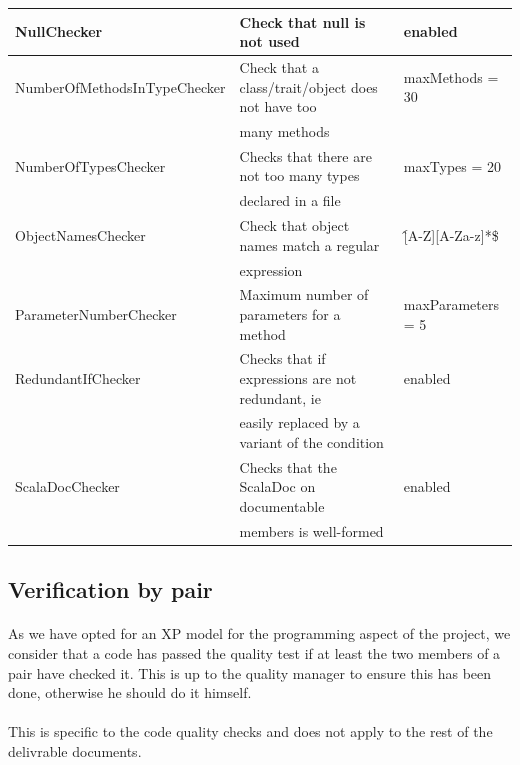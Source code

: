 \documentclass{report}
\begin{document}
\begin{center}
\begin{longtable}{|l|l|l|}
\hline
NullChecker & \small{Check that null is not used} & enabled \\
\hline
\small{NumberOfMethodsInTypeChecker} & \small{Check that a class/trait/object does not have too} & maxMethods = 30 \\
& \small{many methods} & \\
\hline
NumberOfTypesChecker & \small{Checks that there are not too many types} & maxTypes = 20 \\
& \small{declared in a file} & \\
\hline
ObjectNamesChecker & \small{Check that object names match a regular}  & \^[A-Z][A-Za-z]*\$ \\
& \small{expression} & \\
\hline
ParameterNumberChecker & \small{Maximum number of parameters for a method} & maxParameters = 5 \\
\hline
RedundantIfChecker & \small{Checks that if expressions are not redundant, ie} & enabled \\
& \small{easily replaced by a variant of the condition} &  \\
\hline
ScalaDocChecker & \small{Checks that the ScalaDoc on documentable}  & enabled \\
& \small{members is well-formed} & \\
\hline
\end{longtable} 
\end{center}
\renewcommand{\arraystretch}{1}
\subsection{Verification by pair}

\paragraph{}
\hspace{4mm}\textnormal{As we have opted for an XP model for the programming aspect of the project,
we consider that a code has passed the quality test if at least the two members of a pair
have checked it. This is up to the quality manager to ensure this has been done, otherwise he
should do it himself.}

\paragraph{}
\hspace{4mm}\textnormal{This is specific to the code quality checks and does not apply to the rest of the delivrable documents.}
\end{document}
